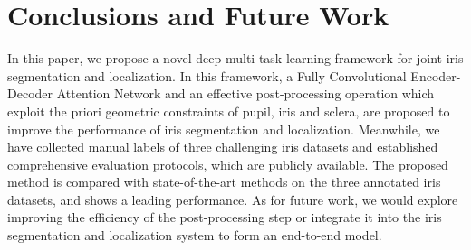 \documentclass[journal]{IEEEtran}
\begin{document}
\section{Conclusions and Future Work}
In this paper, we propose a novel deep multi-task learning framework for joint iris segmentation and localization. In this framework, a Fully Convolutional Encoder-Decoder Attention Network and an effective post-processing operation which exploit the priori geometric constraints of pupil, iris and sclera, are proposed to improve the performance of iris segmentation and localization.
Meanwhile, we have collected manual labels of three challenging iris datasets and established comprehensive evaluation protocols, which are publicly available. The proposed method is compared with state-of-the-art methods on the three annotated iris datasets, and shows a leading performance. As for future work, we would explore improving the efficiency of the post-processing step or integrate it into the iris segmentation and localization system to form an end-to-end model.





\end{document}

